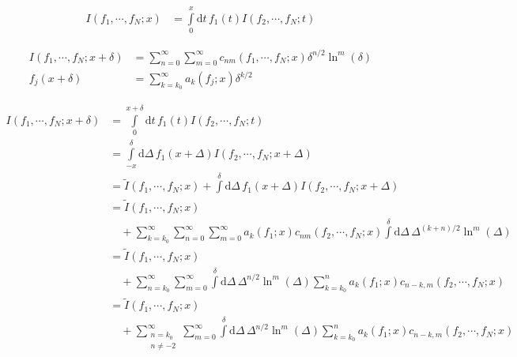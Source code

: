 \documentclass[a4paper,10pt,fleqn]{scrartcl}
\begin{document}
    \begin{align*}
        I(f_1,\cdots,f_N;x)
        &=
        \int\limits_0^{x} \mathrm{d}t\,f_1(t) I(f_2,\cdots,f_N;t)
    \end{align*}

    \begin{align*}
        I(f_1,\cdots,f_N;x+\delta)
        &=
        \sum\limits_{n=0}^\infty
        \sum\limits_{m=0}^\infty
        c_{nm}(f_1,\cdots,f_N;x)
        \delta^{n/2}
        \ln^m(\delta)
        \\
        f_j(x+\delta)
        &=
        \sum\limits_{k=k_0}^\infty
        a_k(f_j;x)
        \delta^{k/2}
    \end{align*}

    \begin{align*}
        I(f_1,\cdots,f_N;x+\delta)
        &=
        \int\limits_0^{x+\delta} \mathrm{d}t\,f_1(t) I(f_2,\cdots,f_N;t)
        \\
        &=
        \int\limits_{-x}^{\delta} \mathrm{d}\Delta\,f_1(x+\Delta) I(f_2,\cdots,f_N;x+\Delta)
        \\
        &=
        {\tilde I}(f_1,\cdots,f_N;x)
        +
        \int\limits^{\delta} \mathrm{d}\Delta\,f_1(x+\Delta) I(f_2,\cdots,f_N;x+\Delta)
        \\
        &=
        {\tilde I}(f_1,\cdots,f_N;x)
        \\ &\quad
        +
        \sum\limits_{k=k_0}^\infty
        \sum\limits_{n=0}^\infty
        \sum\limits_{m=0}^\infty
        a_k(f_1;x)
        c_{nm}(f_2,\cdots,f_N;x)
        \int\limits^{\delta} \mathrm{d}\Delta\,
        \Delta^{(k+n)/2}
        \ln^m(\Delta)
        \\
        &=
        {\tilde I}(f_1,\cdots,f_N;x)
        \\ &\quad
        +
        \sum\limits_{n=k_0}^\infty
        \sum\limits_{m=0}^\infty
        \int\limits^{\delta} \mathrm{d}\Delta\,
        \Delta^{n/2}
        \ln^m(\Delta)
        \sum\limits_{k=k_0}^n
        a_k(f_1;x)
        c_{n-k,m}(f_2,\cdots,f_N;x)
        \\
        &=
        {\tilde I}(f_1,\cdots,f_N;x)
        \\ &\quad
        +
        \sum_{\substack{n=k_0\\n\neq-2}}^\infty
        \sum_{m=0}^\infty
        \int\limits^{\delta} \mathrm{d}\Delta\,
        \Delta^{n/2}
        \ln^m(\Delta)
        \sum\limits_{k=k_0}^n
        a_k(f_1;x)
        c_{n-k,m}(f_2,\cdots,f_N;x)

\end{align*}
\end{document}
